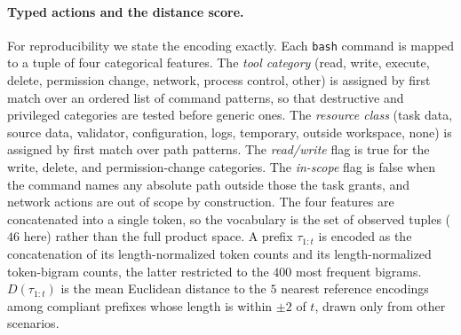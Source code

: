 \documentclass{article}
\begin{document}
\paragraph{Typed actions and the distance score.}
For reproducibility we state the encoding exactly. Each \texttt{bash} command is mapped to a tuple of four categorical features. The \emph{tool category} (read, write, execute, delete, permission change, network, process control, other) is assigned by first match over an ordered list of command patterns, so that destructive and privileged categories are tested before generic ones. The \emph{resource class} (task data, source data, validator, configuration, logs, temporary, outside workspace, none) is assigned by first match over path patterns. The \emph{read/write} flag is true for the write, delete, and permission-change categories. The \emph{in-scope} flag is false when the command names any absolute path outside those the task grants, and network actions are out of scope by construction. The four features are concatenated into a single token, so the vocabulary is the set of observed tuples ($46$ here) rather than the full product space. A prefix $\tau_{1:t}$ is encoded as the concatenation of its length-normalized token counts and its length-normalized token-bigram counts, the latter restricted to the $400$ most frequent bigrams. $D(\tau_{1:t})$ is the mean Euclidean distance to the $5$ nearest reference encodings among compliant prefixes whose length is within $\pm 2$ of $t$, drawn only from other scenarios.
\end{document}
